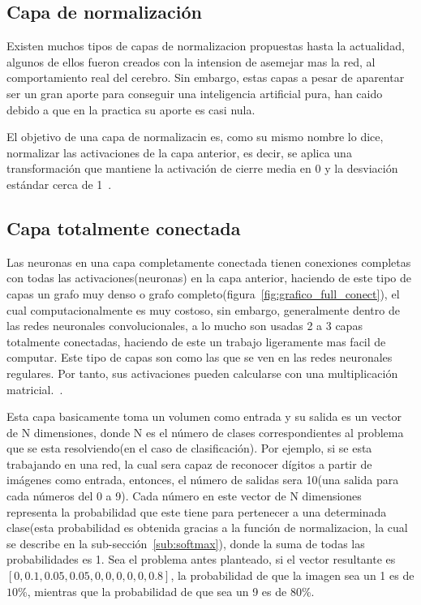 \subsection{Capa de normalización}
Existen muchos tipos de capas de normalizacion propuestas hasta la actualidad, algunos de ellos fueron creados con la intension de asemejar mas la red, al comportamiento real del cerebro. Sin embargo, estas capas a pesar de aparentar ser un gran aporte para conseguir una inteligencia artificial pura, han caido debido a que en la practica su aporte es casi nula. 

El objetivo de una capa de normalizacin es, como su mismo nombre lo dice, normalizar las activaciones de la capa anterior, es decir, se aplica una transformación que mantiene la activación de cierre media en 0 y la desviación estándar cerca de 1~\cite{22RedesNeuronalesConvolu}.

\subsection{Capa totalmente conectada}
Las neuronas en una capa completamente conectada tienen conexiones completas con todas las activaciones(neuronas) en la capa anterior, haciendo de este tipo de capas un grafo muy denso o grafo completo(figura~\ref{fig:grafico_full_conect}), el cual computacionalmente es muy costoso, sin embargo, generalmente dentro de las redes neuronales convolucionales, a lo mucho son usadas 2 a 3 capas totalmente conectadas, haciendo de este un trabajo ligeramente mas facil de computar. Este tipo de capas son como las que se ven en las redes neuronales regulares. Por tanto, sus activaciones pueden calcularse con una multiplicación matricial.~\cite{22RedesNeuronalesConvolu}.

Esta capa basicamente toma un volumen como entrada y su salida es un vector de N dimensiones, donde N es el número de clases correspondientes al problema que se esta resolviendo(en el caso de clasificación). Por ejemplo, si se esta trabajando en una red, la cual sera capaz de reconocer dígitos a partir de imágenes como entrada, entonces, el número de salidas sera 10(una salida para cada números del 0 a 9). Cada número en este vector de N dimensiones representa la probabilidad que este tiene para pertenecer a una determinada clase(esta probabilidad es obtenida gracias a la función de normalizacion, la cual se describe en la sub-sección~\ref{sub:softmax}), donde la suma de todas las probabilidades es 1. Sea el problema antes planteado, si el vector resultante es $[0, 0.1, 0.05 , 0.05, 0, 0, 0, 0, 0, 0.8]$, la probabilidad de que la imagen sea un 1 es de $10$\%, mientras que la probabilidad de que sea un 9 es de $80$\%.


